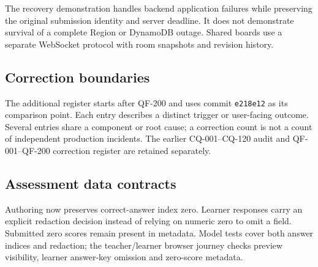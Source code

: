 \documentclass[10pt,a4paper]{article}
\begin{document}
The recovery demonstration handles backend application failures while preserving the original submission identity and server deadline. It does not demonstrate survival of a complete Region or DynamoDB outage. Shared boards use a separate WebSocket protocol with room snapshots and revision history.

\begin{center}
\end{center}

\subsection{Correction boundaries}
The additional register starts after QF-200 and uses commit \texttt{e218e12} as its comparison point. Each entry describes a distinct trigger or user-facing outcome. Several entries share a component or root cause; a correction count is not a count of independent production incidents. The earlier CQ-001--CQ-120 audit and QF-001--QF-200 correction register are retained separately.



\subsection{Assessment data contracts}
Authoring now preserves correct-answer index zero. Learner responses carry an explicit redaction decision instead of relying on numeric zero to omit a field. Submitted zero scores remain present in metadata. Model tests cover both answer indices and redaction; the teacher/learner browser journey checks preview visibility, learner answer-key omission and zero-score metadata.
\end{document}
